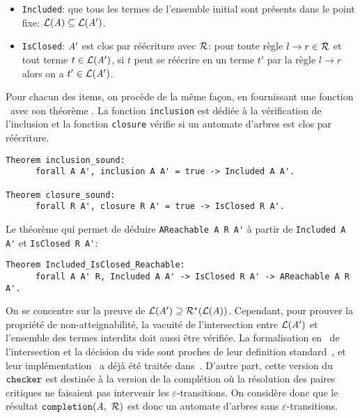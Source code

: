 \begin{itemize}
\item \lstinline!Included!: que tous les termes de l'ensemble initial sont présents  dans le point fixe: $\mathcal{L}(\mathit A) \subseteq \mathcal{L}(\mathit A')$.

\item \lstinline!IsClosed!: $\mathit A'$ est clos par réécriture avec $\mathcal R$: pour toute règle $l \rightarrow
  r \in \mathcal R$ et tout terme $t \in \mathcal{L}(\mathit A')$, si $t$ peut se réécrire en un terme $t'$ par la règle
  $l \rightarrow r$ alors on a $t' \in \mathcal{L}(\mathit A')$. 
\end{itemize}
Pour chacun des items, on procède de la même façon, en fournissant une fonction \coq\ avec son théorème \coq.
La fonction \texttt{inclusion} est dédiée à la vérification de l'inclusion et la fonction \texttt{closure}
vérifie si un automate d'arbres est clos par réécriture. 
\begin{lstlisting}
Theorem inclusion_sound:
      forall A A', inclusion A A' = true -> Included A A'.

Theorem closure_sound:
      forall R A', closure R A' = true -> IsClosed R A'.
\end{lstlisting}

Le théorème qui permet de déduire \lstinline!AReachable A R A'! à partir de \lstinline!Included A A'! et \lstinline!IsClosed R A'!:
\begin{lstlisting}
Theorem Included_IsClosed_Reachable:
      forall A A' R, Included A A' -> IsClosed R A' -> AReachable A R A'.
\end{lstlisting}


On se concentre sur la preuve de  $\mathcal{L}(\mathit A')\supseteq \mathcal R^*(\mathcal{L}(\mathit A))$. 
Cependant, pour prouver la propriété de non-atteignabilité, la vacuité de l'intersection
entre $\mathcal{L}(\mathit A')$ et l'ensemble des termes interdits doit aussi être vérifiée.
La formalisation en \coq\ de l'intersection et la décision du vide sont proches
de leur definition standard~\cite{TATA}, et leur implémentation
\coq\ a déjà été traitée dans~\cite{RivalGL-TPHOL01}.
D'autre part, cette version du $\mathtt{checker}$ est destinée à la version de la complétion où 
la résolution des paires critiques ne faisaient pas intervenir les $\varepsilon$-transitions.
On considère donc que le résultat $\mathtt{completion}(\mathit A,\ \mathcal R)$ est donc un automate d'arbres 
sans $\varepsilon$-transitions. 

